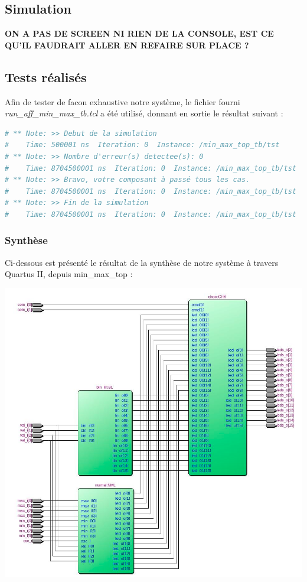 \subsection{Simulation}
\textbf{ON A PAS DE SCREEN NI RIEN DE LA CONSOLE, EST CE QU'IL FAUDRAIT ALLER EN REFAIRE SUR PLACE ?}
\subsection{Tests réalisés}
Afin de tester de facon exhaustive notre système, le fichier fourni \textit{run\_aff\_min\_max\_tb.tcl} a été utilisé, donnant en sortie le résultat suivant : 
\begin{lstlisting}[language=bash]
# ** Note: >> Debut de la simulation
#    Time: 500001 ns  Iteration: 0  Instance: /min_max_top_tb/tst
# ** Note: >> Nombre d'erreur(s) detectee(s): 0
#    Time: 8704500001 ns  Iteration: 0  Instance: /min_max_top_tb/tst
# ** Note: >> Bravo, votre composant à passé tous les cas.
#    Time: 8704500001 ns  Iteration: 0  Instance: /min_max_top_tb/tst
# ** Note: >> Fin de la simulation
#    Time: 8704500001 ns  Iteration: 0  Instance: /min_max_top_tb/tst

\end{lstlisting}
\newpage
\subsubsection{Synthèse}
Ci-dessous est présenté le résultat de la synthèse de notre système à travers Quartus II, depuis min\_max\_top :
\begin{minipage}{\textwidth}
	\center
	\includegraphics[width=\textwidth]{figures/min_max_top.png}
    	\end{minipage}
    	
